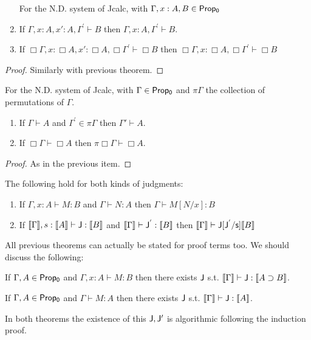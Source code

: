 					\begin{theorem}[Contraction]
						\begin{enumerate}
							For the N.D. system of Jcalc, with $\Gamma,x:A,B\in {\sf Prop_0}$ 
							\item If  $\Gamma,x:A,x':A,\Gamma^{\prime}\vdash  B$ then $\Gamma,x:A,\Gamma^{\prime}\vdash   B$.
							\item If $\Box\Gamma,x:\Box A,x':\Box A,\Box\Gamma^{\prime}\vdash \Box B$ then $\Box\Gamma,x:\Box A,\Box \Gamma^{\prime}\vdash  \Box B$
						\end{enumerate}  
					\end{theorem}
					\begin{proof}
						Similarly with previous theorem.
					\end{proof}
					\begin{theorem}[Permutation]
						For the N.D. system of Jcalc, with $\Gamma\in {\sf Prop_0}$ and $\pi \Gamma$ the collection of permutations of $\Gamma$.
						\begin{enumerate}
							\item If  $\Gamma\vdash   A$ and $\Gamma^{\prime}\in \pi{\Gamma}$ then $\Gamma'\vdash   A$.
							\item If  $\Box\Gamma\vdash \Box   A$ then  $ \pi\Box\Gamma\vdash \Box   A$.
						\end{enumerate}
					\end{theorem}
					\begin{proof}
						As in the previous item.
					\end{proof}
					\begin{theorem}
						The following hold for both kinds of judgments:
						\begin{enumerate}
							\item If  $\Gamma,x:A\vdash M: B$ and $\Gamma\vdash N: A$ then $\Gamma\vdash M[N/x]: B$ 
							\item If  $\llbracket\Gamma\rrbracket,s:\llbracket A \rrbracket \vdash {\sf J}: \llbracket B\rrbracket$ and 
							$\llbracket\Gamma\rrbracket\vdash {\sf J^{'}}: \llbracket B\rrbracket$ then  $\llbracket\Gamma\rrbracket\vdash  {\sf J[J^{'}/s]}\llbracket B\rrbracket$
						\end{enumerate}
					\end{theorem}
					All previous  theorems can actually be stated for proof terms too. We should discuss the following:
					\begin{theorem}
						\label{deductterms}
						If $\Gamma, A\in {\sf Prop_0}$ and $\Gamma,x:A\vdash M:B$ then there exists ${\sf J}$ s.t.    $\llbracket\Gamma\rrbracket \vdash {\sf J}:\llbracket   A\supset B\rrbracket$.
					\end{theorem}
					\begin{lemma}
						\label{highorder}
						If $\Gamma, A \in {\sf Prop_0}$ and $\Gamma\vdash M: A$ then there exists ${\sf J}$ s.t. $\llbracket \Gamma\rrbracket \vdash {\sf J}:\llbracket   A \rrbracket$. 
					\end{lemma}
					In both theorems the existence of this ${\sf J,J^\prime}$ is algorithmic following the induction proof. 
